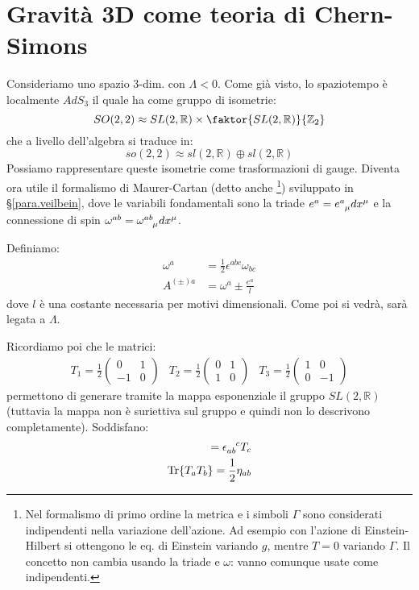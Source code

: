 \section{Gravità 3D come teoria di Chern-Simons}
Consideriamo uno spazio 3-dim. con $\Lambda < 0$. Come già visto, lo spaziotempo è localmente $AdS_3$ il quale ha come gruppo di isometrie:
\begin{equation*}
    SO(2,2) \approx SL(2,\mathbb R) \times \faktor{SL(2,\mathbb R)}{\mathbb Z_2}
\end{equation*}
che a livello dell'algebra si traduce in:
\begin{equation*}
    so(2,2) \approx sl(2,\mathbb R) \oplus sl(2,\mathbb R) 
\end{equation*}
Possiamo rappresentare queste isometrie come trasformazioni di gauge. Diventa ora utile il formalismo di Maurer-Cartan (detto anche \footnote{Nel formalismo di primo ordine la metrica e i simboli $\Gamma$ sono considerati indipendenti nella variazione dell'azione. Ad esempio con l'azione di Einstein-Hilbert si ottengono le eq. di Einstein variando $g$, mentre $T=0$ variando $\Gamma$. Il concetto non cambia usando la triade e $\omega$: vanno comunque usate come indipendenti.}) sviluppato in \S\ref{para.veilbein}, dove le variabili fondamentali sono la triade $e^a = \tensor{e}{^a_\mu}dx^\mu$ e la connessione di spin $\omega^{ab} = \tensor{\omega}{^{ab}_\mu}dx^\mu$.

Definiamo:
\begin{align}
    \omega^a &= \frac{1}{2}\epsilon^{abc}\omega_{bc} \label{eq.cs_omega}\\
    A^{(\pm)a} &= \omega^a \pm \frac{e^a}{l} \label{eq.cs_A_pm}
\end{align}
dove $l$ è una costante necessaria per motivi dimensionali. Come poi si vedrà, sarà legata a $\Lambda$.

Ricordiamo poi che le matrici:
\begin{equation}
    \begin{array}{ccc}
    T_1 = \frac{1}{2}\begin{pmatrix} 0 & 1 \\ -1 & 0\end{pmatrix} & T_2 = \frac{1}{2}\begin{pmatrix} 0 & 1 \\ 1 & 0 \end{pmatrix} & T_3 = \frac{1}{2}\begin{pmatrix} 1 & 0 \\ 0 & -1 \end{pmatrix}
    \end{array}
\end{equation}
permettono di generare tramite la mappa esponenziale il gruppo $SL(2,\mathbb R)$ (tuttavia la mappa non è suriettiva sul gruppo e quindi non lo descrivono completamente). Soddisfano:
\begin{align*}
    [ T_a, T_b] = \tensor{\epsilon}{_{ab}^c} T_c \\
    \Tr{T_a T_b} = \frac{1}{2}\eta_{ab}
\end{align*}

